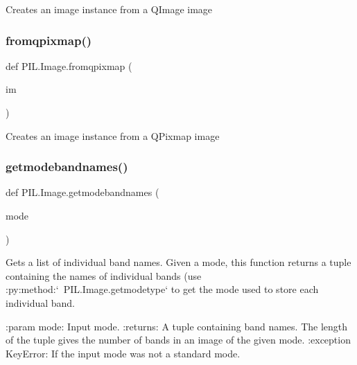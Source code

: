 \begin{DoxyVerb}Creates an image instance from a QImage image\end{DoxyVerb}
 \mbox{\label{namespacePIL_1_1Image_aec27bb6d5f0631be635a7adb5e69543f}} 
\subsubsection{\texorpdfstring{fromqpixmap()}{fromqpixmap()}}
{\footnotesize\ttfamily def P\+I\+L.\+Image.\+fromqpixmap (\begin{DoxyParamCaption}\item[{}]{im }\end{DoxyParamCaption})}

\begin{DoxyVerb}Creates an image instance from a QPixmap image\end{DoxyVerb}
 \mbox{\label{namespacePIL_1_1Image_aaed91fedabe8cc0158bb5959a96dc350}} 
\subsubsection{\texorpdfstring{getmodebandnames()}{getmodebandnames()}}
{\footnotesize\ttfamily def P\+I\+L.\+Image.\+getmodebandnames (\begin{DoxyParamCaption}\item[{}]{mode }\end{DoxyParamCaption})}

\begin{DoxyVerb}Gets a list of individual band names.  Given a mode, this function returns
a tuple containing the names of individual bands (use
:py:method:`~PIL.Image.getmodetype` to get the mode used to store each
individual band.

:param mode: Input mode.
:returns: A tuple containing band names.  The length of the tuple
    gives the number of bands in an image of the given mode.
:exception KeyError: If the input mode was not a standard mode.
\end{DoxyVerb}
 \mbox{\label{namespacePIL_1_1Image_a49d529acf29fb98d6677bbe21c7b664f}} 
